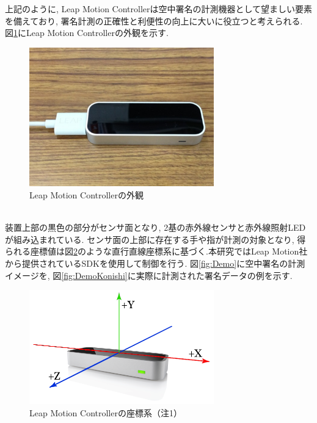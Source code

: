 上記のように, Leap Motion Controllerは空中署名の計測機器として望ましい要素を備えており, 署名計測の正確性と利便性の向上に大いに役立つと考えられる. 図\ref{fig:LeapMotion}にLeap Motion Controllerの外観を示す.
\\
\begin{figure}[htbp]
  \begin{center}
    \includegraphics[clip,width=8.0cm]{./images/LeapMotion.png}
    \caption{Leap Motion Controllerの外観}
    \label{fig:LeapMotion}
  \end{center}
\end{figure}\\

装置上部の黒色の部分がセンサ面となり, 2基の赤外線センサと赤外線照射LEDが組み込まれている. センサ面の上部に存在する手や指が計測の対象となり, 得られる座標値は図\ref{fig:LeapAxes}のような直行直線座標系に基づく.本研究ではLeap Motion社から提供されているSDKを使用して制御を行う. 図\ref{fig:Demo}に空中署名の計測イメージを, 図\ref{fig:DemoKonishi}に実際に計測された署名データの例を示す. 

\begin{figure}[htbp]
  \begin{center}
    \includegraphics[clip,width=8.0cm]{./images/LeapAxes.png}
    \caption{Leap Motion Controllerの座標系（注1）}
    \label{fig:LeapAxes}
  \end{center}
\end{figure}

